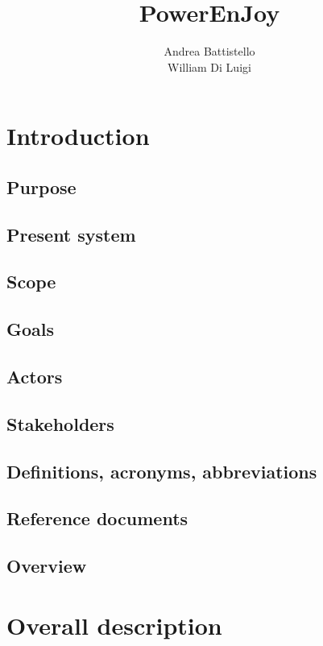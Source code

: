 \documentclass[12pt, a4paper]{article}
\title{{\Huge PowerEnJoy}}
\author{
	Andrea Battistello
	\\
	William Di Luigi
}
\begin{document}
\maketitle
\tableofcontents



\newpage
\section{Introduction}
	\subsection{Purpose}

	\subsection{Present system}
	
	\subsection{Scope}
	
	\subsection{Goals}

	\subsection{Actors}

	\subsection{Stakeholders}
	
	\subsection{Definitions, acronyms, abbreviations}
	
	
	\subsection{Reference documents}

	
	\subsection{Overview}


\newpage
\section{Overall description}
\end{document}
